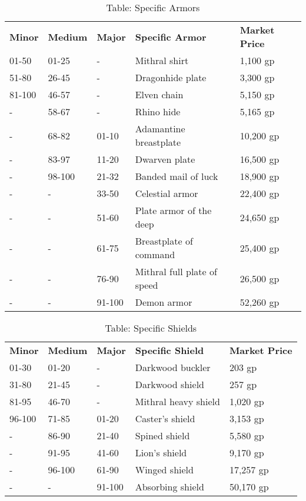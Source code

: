 \begin{table}[]
\sffamily
\caption{Table: Specific Armors}
\setlength{\tabcolsep}{1pt}
\begin{tabularx}{\linewidth}{lllXl}
\textbf{Minor} & \textbf{Medium} & \textbf{Major} & \textbf{Specific Armor} & \textbf{Market Price}\\
01-50 & 01-25 & - & Mithral shirt  & 1,100 gp\\
51-80 & 26-45 & - & Dragonhide plate  & 3,300 gp\\
81-100 & 46-57 & - & Elven chain  & 5,150 gp\\
- & 58-67 & - & Rhino hide  & 5,165 gp\\
- & 68-82 & 01-10 & Adamantine breastplate & 10,200 gp\\
- & 83-97 & 11-20 & Dwarven plate  & 16,500 gp\\
- & 98-100 & 21-32 & Banded mail of luck & 18,900 gp\\
- & - & 33-50 & Celestial armor  & 22,400 gp\\
- & - & 51-60 & Plate armor of the deep & 24,650 gp\\
- & - & 61-75 & Breastplate of command & 25,400 gp\\
- & - & 76-90 & Mithral full plate of speed & 26,500 gp\\
- & - & 91-100 & Demon armor  & 52,260 gp\\
\end{tabularx}
\end{table}
\begin{table}[]
\sffamily
\setlength{\tabcolsep}{1pt}
\caption{Table: Specific Shields}
\begin{tabularx}{\linewidth}{lllXl}
\textbf{Minor} & \textbf{Medium} & \textbf{Major} & \textbf{Specific Shield} & \textbf{Market Price}\\
01-30 & 01-20 & - & Darkwood buckler & 203 gp\\
31-80 & 21-45 & - & Darkwood shield & 257 gp\\
81-95 & 46-70 & - & Mithral heavy shield & 1,020 gp\\
96-100 & 71-85 & 01-20 & Caster's shield & 3,153 gp\\
- & 86-90 & 21-40 & Spined shield & 5,580 gp\\
- & 91-95 & 41-60 & Lion's shield & 9,170 gp\\
- & 96-100 & 61-90 & Winged shield & 17,257 gp\\
- & - & 91-100 & Absorbing shield & 50,170 gp\\
\end{tabularx}
\end{table}

